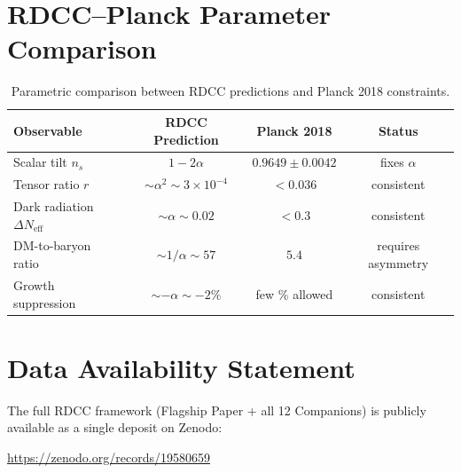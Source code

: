 \documentclass[11pt,a4paper]{article}
\begin{document}
\section{RDCC–Planck Parameter Comparison}
\label{app:table}

\begin{table}[H]
\centering
\caption{Parametric comparison between RDCC predictions and Planck 2018 constraints.}
\begin{tabular}{lccc}
\hline
Observable & RDCC Prediction & Planck 2018 & Status \\
\hline
Scalar tilt $n_s$ & $1 - 2\alpha$ & $0.9649 \pm 0.0042$ & fixes $\alpha$ \\
Tensor ratio $r$ & $\sim \alpha^2 \sim 3\times10^{-4}$ & $<0.036$ & consistent \\
Dark radiation $\Delta N_{\mathrm{eff}}$ & $\sim \alpha \sim 0.02$ & $<0.3$ & consistent \\
DM-to-baryon ratio & $\sim 1/\alpha \sim 57$ & $5.4$ & requires asymmetry \\
Growth suppression & $\sim -\alpha \sim -2\%$ & few \% allowed & consistent \\
\hline
\end{tabular}
\end{table}


\section*{Data Availability Statement}
The full RDCC framework (Flagship Paper + all 12 Companions) is publicly available as a single deposit on Zenodo:

\href{https://zenodo.org/records/19580659}{https://zenodo.org/records/19580659}

\vspace{1.0cm} 
\end{document}
